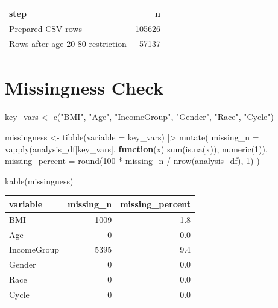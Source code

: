 \documentclass[
  letterpaper,
  DIV=11,
  numbers=noendperiod,
  oneside]{scrreprt}
\newenvironment{Shaded}{\begin{snugshade}}{\end{snugshade}}
\newcommand{\AttributeTok}[1]{\textcolor[rgb]{0.40,0.45,0.13}{#1}}
\newcommand{\ControlFlowTok}[1]{\textcolor[rgb]{0.00,0.23,0.31}{\textbf{#1}}}
\newcommand{\DecValTok}[1]{\textcolor[rgb]{0.68,0.00,0.00}{#1}}
\newcommand{\FunctionTok}[1]{\textcolor[rgb]{0.28,0.35,0.67}{#1}}
\newcommand{\NormalTok}[1]{\textcolor[rgb]{0.00,0.23,0.31}{#1}}
\newcommand{\OtherTok}[1]{\textcolor[rgb]{0.00,0.23,0.31}{#1}}
\newcommand{\SpecialCharTok}[1]{\textcolor[rgb]{0.37,0.37,0.37}{#1}}
\newcommand{\StringTok}[1]{\textcolor[rgb]{0.13,0.47,0.30}{#1}}
\begin{document}
\begin{longtable}[]{@{}lr@{}}
\toprule\noalign{}
step & n \\
\midrule\noalign{}
\endhead
\bottomrule\noalign{}
\endlastfoot
Prepared CSV rows & 105626 \\
Rows after age 20-80 restriction & 57137 \\
\end{longtable}

\section*{Missingness Check}\label{missingness-check}


\begin{Shaded}
\begin{Highlighting}[numbers=left,,]
\NormalTok{key\_vars }\OtherTok{\textless{}{-}} \FunctionTok{c}\NormalTok{(}\StringTok{"BMI"}\NormalTok{, }\StringTok{"Age"}\NormalTok{, }\StringTok{"IncomeGroup"}\NormalTok{, }\StringTok{"Gender"}\NormalTok{, }\StringTok{"Race"}\NormalTok{, }\StringTok{"Cycle"}\NormalTok{)}

\NormalTok{missingness }\OtherTok{\textless{}{-}} \FunctionTok{tibble}\NormalTok{(}\AttributeTok{variable =}\NormalTok{ key\_vars) }\SpecialCharTok{|\textgreater{}}
  \FunctionTok{mutate}\NormalTok{(}
    \AttributeTok{missing\_n =} \FunctionTok{vapply}\NormalTok{(analysis\_df[key\_vars], }\ControlFlowTok{function}\NormalTok{(x) }\FunctionTok{sum}\NormalTok{(}\FunctionTok{is.na}\NormalTok{(x)), }\FunctionTok{numeric}\NormalTok{(}\DecValTok{1}\NormalTok{)),}
    \AttributeTok{missing\_percent =} \FunctionTok{round}\NormalTok{(}\DecValTok{100} \SpecialCharTok{*}\NormalTok{ missing\_n }\SpecialCharTok{/} \FunctionTok{nrow}\NormalTok{(analysis\_df), }\DecValTok{1}\NormalTok{)}
\NormalTok{  )}

\FunctionTok{kable}\NormalTok{(missingness)}
\end{Highlighting}
\end{Shaded}

\begin{longtable}[]{@{}lrr@{}}
\toprule\noalign{}
variable & missing\_n & missing\_percent \\
\midrule\noalign{}
\endhead
\bottomrule\noalign{}
\endlastfoot
BMI & 1009 & 1.8 \\
Age & 0 & 0.0 \\
IncomeGroup & 5395 & 9.4 \\
Gender & 0 & 0.0 \\
Race & 0 & 0.0 \\
Cycle & 0 & 0.0 \\
\end{longtable}
\end{document}
